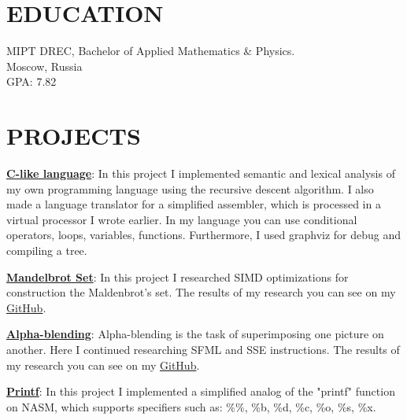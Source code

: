 \documentclass[margin]{res}
\begin{document}
\begin{resume}

\section{EDUCATION}
MIPT DREC, Bachelor of Applied Mathematics \& Physics. \\
Moscow, Russia\\
GPA: 7.82

\section{PROJECTS}
\par
\textbf{\href{https://github.com/KirillLakhnov/Language}{C-like language}}: 
In this project I implemented semantic and lexical analysis of my own programming language using the recursive descent algorithm. I also made a language translator for a simplified assembler, which is processed in a virtual processor I wrote earlier. In my language you can use conditional operators, loops, variables, functions. Furthermore, I used graphviz for debug and compiling a tree.

\par
\textbf{\href{https://github.com/KirillLakhnov/Mandelbrot}{Mandelbrot Set}}:
In this project I researched SIMD optimizations for construction the Maldenbrot's set. The results of my research you can see on my \href{https://github.com/KirillLakhnov/Mandelbrot}{GitHub}.

\par
\textbf{\href{https://github.com/KirillLakhnov/Alpha-blending}{Alpha-blending}}: 
Alpha-blending is the task of superimposing one picture on another. Here I continued researching SFML and SSE instructions. The results of my research you can see on my \href{https://github.com/KirillLakhnov/Alpha-blending}{GitHub}.

\par
\textbf{\href{https://github.com/KirillLakhnov/ASM_PRINTF}{Printf}}: 
In this project I implemented a simplified analog of the "printf" function on NASM, which supports specifiers such as: \%\%, \%b, \%d, \%c, \%o, \%s, \%x.



\end{resume}
\end{document}
